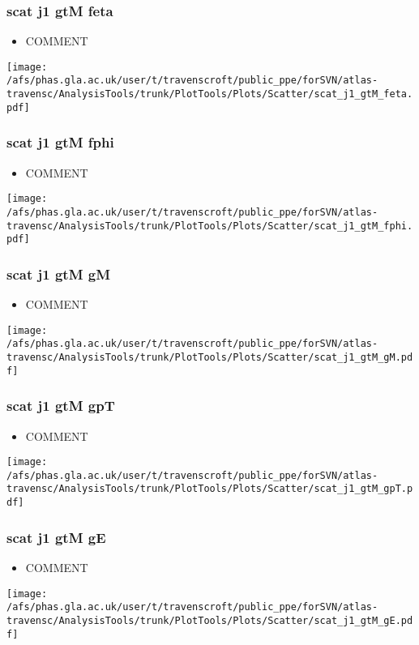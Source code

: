\documentclass{beamer}
\begin{document}
\begin{frame}
\frametitle{scat j1 gtM feta}
\begin{itemize}
\item COMMENT
\end{itemize}
\begin{center}
\texttt{[image: /afs/phas.gla.ac.uk/user/t/travenscroft/public\_ppe/forSVN/atlas-travensc/AnalysisTools/trunk/PlotTools/Plots/Scatter/scat\_j1\_gtM\_feta.pdf]}
\end{center}
\end{frame}

\begin{frame}
\frametitle{scat j1 gtM fphi}
\begin{itemize}
\item COMMENT
\end{itemize}
\begin{center}
\texttt{[image: /afs/phas.gla.ac.uk/user/t/travenscroft/public\_ppe/forSVN/atlas-travensc/AnalysisTools/trunk/PlotTools/Plots/Scatter/scat\_j1\_gtM\_fphi.pdf]}
\end{center}
\end{frame}

\begin{frame}
\frametitle{scat j1 gtM gM}
\begin{itemize}
\item COMMENT
\end{itemize}
\begin{center}
\texttt{[image: /afs/phas.gla.ac.uk/user/t/travenscroft/public\_ppe/forSVN/atlas-travensc/AnalysisTools/trunk/PlotTools/Plots/Scatter/scat\_j1\_gtM\_gM.pdf]}
\end{center}
\end{frame}

\begin{frame}
\frametitle{scat j1 gtM gpT}
\begin{itemize}
\item COMMENT
\end{itemize}
\begin{center}
\texttt{[image: /afs/phas.gla.ac.uk/user/t/travenscroft/public\_ppe/forSVN/atlas-travensc/AnalysisTools/trunk/PlotTools/Plots/Scatter/scat\_j1\_gtM\_gpT.pdf]}
\end{center}
\end{frame}

\begin{frame}
\frametitle{scat j1 gtM gE}
\begin{itemize}
\item COMMENT
\end{itemize}
\begin{center}
\texttt{[image: /afs/phas.gla.ac.uk/user/t/travenscroft/public\_ppe/forSVN/atlas-travensc/AnalysisTools/trunk/PlotTools/Plots/Scatter/scat\_j1\_gtM\_gE.pdf]}
\end{center}
\end{frame}
\end{document}

